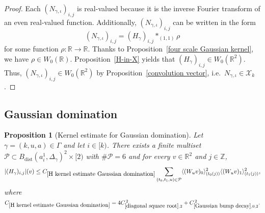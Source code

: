 \documentclass[12pt,reqno]{amsart}
\theoremstyle{plain}
\newtheorem{proposition}[theorem]{Proposition}
\numberwithin{equation}{section}
\theoremstyle{remark}
\newcommand{\using}[1]{}
\newcommand{\Z}{{\mathbb Z}}
\newcommand{\R}{{\mathbb R}}
\begin{document}
\begin{proof}
Each $(N_{\gamma,\iota})_{i,j}$ is real-valued because it is the inverse Fourier transform of an even real-valued function.
Additionally, $(N_{\gamma,\iota})_{i,j}$ can be written in the form
\[
(N_{\gamma,\iota})_{i,j}=(H_\gamma)_{i,j} \ast_{(1,1)} \rho
\]
for some function $\rho: \R \to \R$.
Thanks to Proposition~\ref{four scale Gaussian kernel}, we have $\rho \in W_0(\R)$.  Proposition~\ref{H-in-X} yields that $(H_{\gamma})_{i,j} \in W_0(\R^2)$. Thus, $(N_{\gamma,\iota})_{i,j} \in W_0(\R^2)$ by Proposition~\ref{convolution vector}, i.e.\ $N_{\gamma,\iota} \in \mathcal{X}_k$.
\end{proof}


\subsection{Gaussian domination}

\begin{proposition}[Kernel estimate for Gaussian domination]\label{H kernel estimate Gaussian domination}\using{Operations on spaced sequences}\using{Properties of distance of sequences}\using{diagonal square root}\using{Gaussian bump decay}
Let $\gamma=(k,u,a)\in \Gamma$ and let $i\in [k)$.
There exists a finite multiset $\mathcal{P}\subset B_{\mathrm{dist}}(a_i^1,\Delta_\gamma)^2\times [2)$ with $\#\mathcal{P}= 6$ and for every $v\in \R^2$ and $j\in\Z$,
\begin{equation}\label{auto:H-kernel-Gaussian-domination}|(H_\gamma)_{i,j}|(v) \le C_{\ref{H kernel estimate Gaussian domination}} \sum_{(t_0,t_1,u)\in\mathcal{P}} \langle (W_u v)_0\rangle_{(t_0(j))}^2 \langle (W_u v)_1\rangle_{(t_1(j))}^2, \end{equation}
where
$C_{\ref{H kernel estimate Gaussian domination}}
=
4C_{\ref{diagonal square root},2}^{\,2}
+
C_{\ref{Gaussian bump decay},0,2}^{\,2}.$
\end{proposition}
\end{document}

